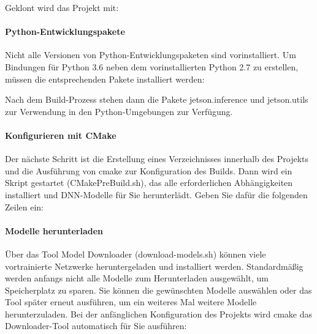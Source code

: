 \medskip
Geklont wird das Projekt mit:
\medskip

 \newline
{} \newline
{} 

\paragraph{Python-Entwicklungspakete}

Nicht alle Versionen von Python-Entwicklungspaketen sind vorinstalliert. 
Um Bindungen für Python 3.6 neben dem vorinstallierten Python 2.7 zu erstellen, müssen die entsprechenden Pakete installiert werden:

\medskip


\medskip

Nach dem Build-Prozess stehen dann die Pakete jetson.inference und jetson.utils zur Verwendung in den Python-Umgebungen zur Verfügung.

\paragraph{Konfigurieren mit CMake}

Der nächste Schritt ist die Erstellung eines Verzeichnisses innerhalb des Projekts und die Ausführung von cmake zur Konfiguration des Builds. Dann wird ein Skript gestartet (CMakePreBuild.sh), das alle erforderlichen Abhängigkeiten installiert und DNN-Modelle für Sie herunterlädt. Geben Sie dafür die folgenden Zeilen ein:

\medskip

 \newline   
{} \newline
{} \newline
{}

\paragraph{Modelle herunterladen}

Über das Tool Model Downloader (download-models.sh) können viele vortrainierte Netzwerke heruntergeladen und installiert werden. Standardmäßig werden anfangs nicht alle Modelle zum Herunterladen ausgewählt, um Speicherplatz zu sparen. Sie können die gewünschten Modelle auswählen oder das Tool später erneut ausführen, um ein weiteres Mal weitere Modelle herunterzuladen.
Bei der anfänglichen Konfiguration des Projekts wird cmake das Downloader-Tool automatisch für Sie ausführen:

